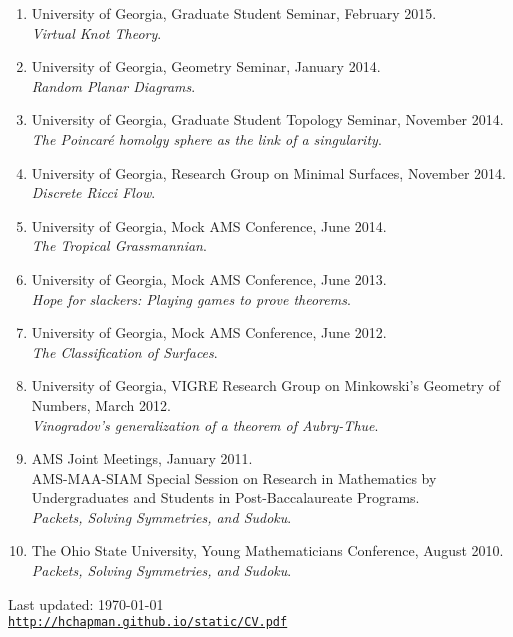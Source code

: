 \documentclass[letterpaper]{article}
\def\footerlink{http://hchapman.github.io/static/CV.pdf}
\begin{document}
\begin{enumerate}
\item University of Georgia, Graduate Student Seminar, February
  2015.\\
\textit{Virtual Knot Theory}.
\item University of Georgia, Geometry Seminar, January 2014.\\
\textit{Random Planar Diagrams}.
\item University of Georgia, Graduate Student Topology Seminar,
  November 2014.\\
\textit{The Poincar\'e homolgy sphere as the link of a singularity}.
\item University of Georgia, Research Group on
  Minimal Surfaces, November 2014.\\
\textit{Discrete Ricci Flow}.
\item University of Georgia, Mock AMS Conference, June 2014.\\
\textit{The Tropical Grassmannian}.
\item University of Georgia, Mock AMS Conference, June 2013.\\
\textit{Hope for slackers: Playing games to prove theorems}.
\item University of Georgia, Mock AMS Conference, June 2012.\\
\textit{The Classification of Surfaces}.
\item University of Georgia, VIGRE Research Group on Minkowski's
  Geometry of Numbers, March 2012.\\
\textit{Vinogradov's generalization of a theorem of Aubry-Thue}.
\item AMS Joint Meetings, January 2011.\\
AMS-MAA-SIAM Special Session on Research in Mathematics by
Undergraduates and Students in Post-Baccalaureate Programs.\\
\textit{Packets, Solving Symmetries, and Sudoku}.
\item The Ohio State University, Young Mathematicians Conference,
  August 2010.\\
\textit{Packets, Solving Symmetries, and Sudoku}.
\end{enumerate}

\bigskip

\begin{center}
  \begin{footnotesize}
    Last updated: \today \\
    \href{\footerlink}{\texttt{\footerlink}}
  \end{footnotesize}
\end{center}
\end{document}
